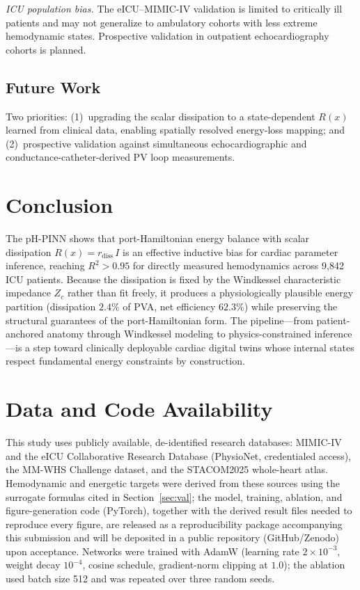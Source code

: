 \documentclass[journal]{IEEEtran}
\begin{document}
\emph{ICU population bias.} The eICU--MIMIC-IV validation is limited to critically ill patients and may not generalize to ambulatory cohorts with less extreme hemodynamic states. Prospective validation in outpatient echocardiography cohorts is planned.

\subsection{Future Work}
Two priorities: (1)~upgrading the scalar dissipation to a state-dependent $R(x)$ learned from clinical data, enabling spatially resolved energy-loss mapping; and (2)~prospective validation against simultaneous echocardiographic and conductance-catheter-derived PV loop measurements.

\section{Conclusion}\label{sec:conclusion}
The pH-PINN shows that port-Hamiltonian energy balance with scalar dissipation $R(x)=r_{\text{diss}}\,I$ is an effective inductive bias for cardiac parameter inference, reaching $R^2>0.95$ for directly measured hemodynamics across 9{,}842 ICU patients. Because the dissipation is fixed by the Windkessel characteristic impedance $Z_c$ \cite{westerhof2009} rather than fit freely, it produces a physiologically plausible energy partition (dissipation $2.4\%$ of PVA, net efficiency $62.3\%$) while preserving the structural guarantees of the port-Hamiltonian form. The pipeline---from patient-anchored anatomy through Windkessel modeling to physics-constrained inference---is a step toward clinically deployable cardiac digital twins whose internal states respect fundamental energy constraints by construction.

\section*{Data and Code Availability}
This study uses publicly available, de-identified research databases: MIMIC-IV and the eICU Collaborative Research Database (PhysioNet, credentialed access), the MM-WHS Challenge dataset, and the STACOM2025 whole-heart atlas. Hemodynamic and energetic targets were derived from these sources using the surrogate formulas cited in Section~\ref{sec:val}; the model, training, ablation, and figure-generation code (PyTorch), together with the derived result files needed to reproduce every figure, are released as a reproducibility package accompanying this submission and will be deposited in a public repository (GitHub/Zenodo) upon acceptance. Networks were trained with AdamW (learning rate $2\times10^{-3}$, weight decay $10^{-4}$, cosine schedule, gradient-norm clipping at $1.0$); the ablation used batch size 512 and was repeated over three random seeds.
\end{document}
